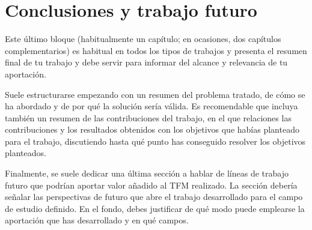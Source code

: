 \chapter{Conclusiones y trabajo futuro}\label{chap:resultados}
Este último bloque (habitualmente un capítulo; en ocasiones, dos capítulos complementarios) es habitual en todos los tipos de trabajos y presenta el resumen final de tu trabajo y debe servir para informar del alcance y relevancia de tu aportación.\par

Suele estructurarse empezando con un resumen del problema tratado, de cómo se ha abordado y de por qué la solución sería válida.
Es recomendable que incluya también un resumen de las contribuciones del trabajo, en el que relaciones las contribuciones y los resultados obtenidos con los objetivos que habías planteado para el trabajo, discutiendo hasta qué punto has conseguido resolver los objetivos planteados.\par

Finalmente, se suele dedicar una última sección a hablar de líneas de trabajo futuro que podrían aportar valor añadido al TFM realizado. La sección debería señalar las perspectivas de futuro que abre el trabajo desarrollado para el campo de estudio definido. En el fondo, debes justificar de qué modo puede emplearse la aportación que has desarrollado y en qué campos.